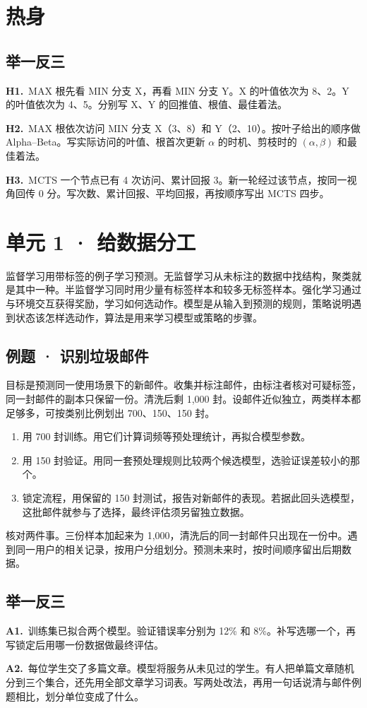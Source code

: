 \documentclass[UTF8,a4paper,11pt]{ctexart}
\newcommand{\PracticeQuestion}[3]{\par\Needspace{4\baselineskip}\noindent\begin{minipage}{\linewidth}\textbf{#1.}\ #2\par\noindent\rule{0pt}{#3mm}\par\end{minipage}\par}
\begin{document}
\section{热身}
\subsection{举一反三}
\PracticeQuestion{H1}{MAX 根先看 MIN 分支 X，再看 MIN 分支 Y。X 的叶值依次为 8、2。Y 的叶值依次为 4、5。分别写 X、Y 的回推值、根值、最佳着法。}{35}
\PracticeQuestion{H2}{MAX 根依次访问 MIN 分支 X（3、8）和 Y（2、10）。按叶子给出的顺序做 Alpha–Beta。写实际访问的叶值、根首次更新 $\alpha$ 的时机、剪枝时的 $(\alpha,\beta)$ 和最佳着法。}{35}
\PracticeQuestion{H3}{MCTS 一个节点已有 4 次访问、累计回报 3。新一轮经过该节点，按同一视角回传 0 分。写次数、累计回报、平均回报，再按顺序写出 MCTS 四步。}{35}
\clearpage
\section{单元 1 · 给数据分工}
监督学习用带标签的例子学习预测。无监督学习从未标注的数据中找结构，聚类就是其中一种。半监督学习同时用少量有标签样本和较多无标签样本。强化学习通过与环境交互获得奖励，学习如何选动作。模型是从输入到预测的规则，策略说明遇到状态该怎样选动作，算法是用来学习模型或策略的步骤。

\subsection{例题 · 识别垃圾邮件}
目标是预测同一使用场景下的新邮件。收集并标注邮件，由标注者核对可疑标签，同一封邮件的副本只保留一份。清洗后剩 1,000 封。设邮件近似独立，两类样本都足够多，可按类别比例划出 700、150、150 封。

\begin{enumerate}
\item 用 700 封训练。用它们计算词频等预处理统计，再拟合模型参数。
\item 用 150 封验证。用同一套预处理规则比较两个候选模型，选验证误差较小的那个。
\item 锁定流程，用保留的 150 封测试，报告对新邮件的表现。若据此回头选模型，这批邮件就参与了选择，最终评估须另留独立数据。
\end{enumerate}
核对两件事。三份样本加起来为 1,000，清洗后的同一封邮件只出现在一份中。遇到同一用户的相关记录，按用户分组划分。预测未来时，按时间顺序留出后期数据。

\subsection{举一反三}
\PracticeQuestion{A1}{训练集已拟合两个模型。验证错误率分别为 12\% 和 8\%。补写选哪一个，再写锁定后用哪一份数据做最终评估。}{23}
\PracticeQuestion{A2}{每位学生交了多篇文章。模型将服务从未见过的学生。有人把单篇文章随机分到三个集合，还先用全部文章学习词表。写两处改法，再用一句话说清与邮件例题相比，划分单位变成了什么。}{26}
\clearpage
\end{document}
